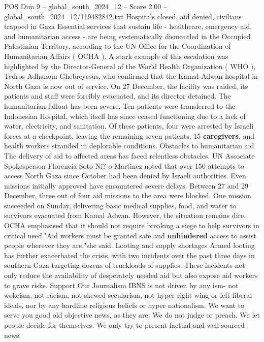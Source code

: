\begin{textsample}{POS Dim 9 – global\_south\_2024\_12 – Score 2.00 – global\_south\_2024\_12/119482842.txt}  \label{ex:f9_pos_328}
Hospitals closed, aid denied, civilians trapped in Gaza Essential services that sustain life - healthcare, emergency aid, and humanitarian access - are being systematically dismantled in the Occupied Palestinian Territory, according to the UN Office for the Coordination of Humanitarian Affairs ( OCHA ).
A stark example of this escalation was highlighted by the Director-General of the World Health Organization ( WHO ), Tedros Adhanom Ghebreyesus, who confirmed that the Kamal Adwan hospital in North Gaza is now out of service.
On 27 December, the facility was raided, its patients and staff were forcibly evacuated, and its director detained.
The humanitarian fallout has been severe.
Ten patients were transferred to the Indonesian Hospital, which itself has since ceased functioning due to a lack of water, electricity, and sanitation.
Of these patients, four were arrested by Israeli forces at a checkpoint, leaving the remaining seven patients, 15 \textbf{caregivers}, and health workers stranded in deplorable conditions.
Obstacles to humanitarian aid The delivery of aid to affected areas has faced relentless obstacles.
UN Associate Spokesperson Florencia Soto Ni? o-Martinez noted that over 150 attempts to access North Gaza since October had been denied by Israeli authorities.
Even missions initially approved have encountered severe delays.
Between 27 and 29 December, three out of four aid missions to the area were blocked.
One mission succeeded on Sunday, delivering basic medical supplies, food, and water to survivors evacuated from Kamal Adwan.
However, the situation remains dire.
OCHA emphasised that it should not require breaking a siege to help survivors in critical need."Aid workers must be granted safe and \textbf{unhindered} access to assist people wherever they are,"she said.
Looting and supply shortages Armed looting has further exacerbated the crisis, with two incidents over the past three days in southern Gaza targeting dozens of truckloads of supplies.
These incidents not only reduce the availability of desperately needed aid but also expose aid workers to grave risks.
Support Our Journalism IBNS is not driven by any ism- not wokeism, not racism, not skewed secularism, not hyper right-wing or left liberal ideals, nor by any hardline religious beliefs or hyper nationalism.
We want to serve you good old objective news, as they are.
We do not judge or preach.
We let people decide for themselves.
We only try to present factual and well-sourced news.

\end{textsample}
